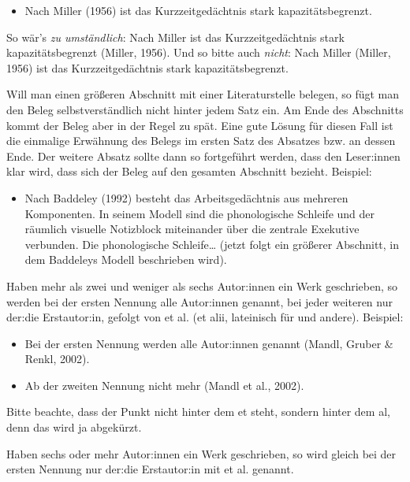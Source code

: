\documentclass{../cssheet}
\begin{document}
\begin{itemize}
\item
  Nach Miller (1956) ist das Kurzzeitgedächtnis stark
  kapazitätsbegrenzt.
\end{itemize}

So wär's \emph{zu umständlich}: \glqq{}Nach Miller ist das Kurzzeitgedächtnis
stark kapazitätsbegrenzt (Miller, 1956).\grqq{} Und so bitte auch
\emph{nicht}: \glqq{}Nach Miller (Miller, 1956) ist das Kurzzeitgedächtnis
stark kapazitätsbegrenzt.\grqq{}

Will man einen größeren Abschnitt mit einer Literaturstelle belegen, so
fügt man den Beleg selbstverständlich nicht hinter jedem Satz ein. Am
Ende des Abschnitts kommt der Beleg aber in der Regel zu spät. Eine gute
Lösung für diesen Fall ist die einmalige Erwähnung des Belegs im ersten
Satz des Absatzes bzw. an dessen Ende. Der weitere Absatz sollte dann so
fortgeführt werden, dass den Leser:innen klar wird, dass sich der Beleg auf
den gesamten Abschnitt bezieht. Beispiel:

\begin{itemize}
\item
  Nach Baddeley (1992) besteht das Arbeitsgedächtnis aus mehreren
  Komponenten. In seinem Modell sind die phonologische Schleife und der
  räumlich visuelle Notizblock miteinander über die zentrale Exekutive
  verbunden. Die phonologische Schleife\ldots{} (jetzt folgt ein
  größerer Abschnitt, in dem Baddeleys Modell beschrieben wird).
\end{itemize}

Haben mehr als zwei und weniger als sechs Autor:innen ein Werk geschrieben,
so werden bei der ersten Nennung alle Autor:innen genannt, bei jeder
weiteren nur der:die Erstautor:in, gefolgt von \glqq{}et al.\grqq{} (\glqq{}et alii\grqq{}, lateinisch
für \glqq{}und andere\grqq{}). Beispiel:

\begin{itemize}
\item
  Bei der ersten Nennung werden alle Autor:innen genannt (Mandl, Gruber \&
  Renkl, 2002).
\item
  Ab der zweiten Nennung nicht mehr (Mandl et al., 2002).
\end{itemize}

Bitte beachte, dass der Punkt nicht hinter dem \glqq{}et\grqq{} steht, sondern
hinter dem \glqq{}al\grqq{}, denn das wird ja abgekürzt.

Haben sechs oder mehr Autor:innen ein Werk geschrieben, so wird gleich bei
der ersten Nennung nur der:die Erstautor:in mit \glqq{}et al.\grqq{} genannt.
\end{document}
